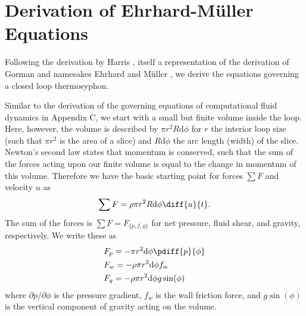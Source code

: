 \chapter{Derivation of Ehrhard-M\"{u}ller Equations}

Following the derivation by Harris , itself a representation of the derivation of Gorman  and namesakes Ehrhard and M\"{u}ller , we derive the equations governing a closed loop thermosyphon.

Similar to the derivation of the governing equations of computational fluid dynamics in Appendix C, we start with a small but finite volume inside the loop.
Here, however, the volume is described by $\pi r^2 R \text{d} \phi$ for $r$ the interior loop size (such that $\pi r^2$ is the area of a slice) and $R\text{d}\phi$ the arc length (width) of the slice.
Newton's second law states that momentum is conserved, such that the sum of the forces acting upon our finite volume is equal to the change in momentum of this volume.
Therefore we have the basic starting point for forces $\sum F$ and velocity $u$ as
\begin{equation} \sum F = \rho \pi r^2 R \text{d}\phi \diff{u}{t} .\end{equation}
The sum of the forces is $\sum F = F_{\{p,f,g\}}$ for net pressure, fluid shear, and gravity, respectively.
We write these as
\begin{align} & F_p = -\pi r^2 \text{d} \phi \pdiff{p}{\phi}\\
& F_w = -\rho \pi r^2 \text{d} \phi f_w\\
& F_g = -\rho \pi r^2 \text{d} \phi g \sin (\phi)\end{align}
where $\partial p /\partial \phi$ is the pressure gradient, $f_w$ is the wall friction force, and $g \sin (\phi)$ is the vertical component of gravity acting on the volume.

